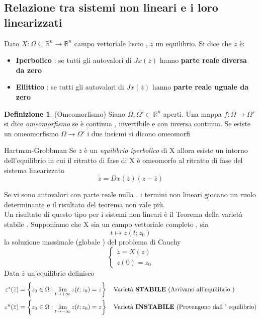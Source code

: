 \documentclass{article}
\theoremstyle{definition}
\newtheorem{definizione}{Definizione}[section]
\newcommand{\R}{\mathbb{R}}
\newcommand{\Rn}{\R^n}
\begin{document}
\subsection{Relazione tra sistemi non lineari e i loro linearizzati }
Dato $X: \Omega\subseteq\Rn\rightarrow\Rn$ campo vettoriale liscio , $\overline{z}$ un equilibrio. Si dice che $\overline{z}$ è: 
\begin{itemize}
	\item  \textbf{Iperbolico} : se tutti gli autovalori di $Jx(\overline{z})$ hanno\textbf{ parte reale diversa da zero }
	\item  \textbf{Ellittico} : se tutti gli autovalori di $Jx(\overline{z})$ hanno\textbf{ parte reale uguale da zero }
\end{itemize}
\begin{definizione}(Omeomorfismo)\newline
Siano $\Omega,\Omega' \subset \Rn$ aperti. Una mappa $f:\Omega \rightarrow \Omega'$ si dice \textit{omeomorfismo} se è continua , invertibile e con inversa continua. 
Se esiste un omeomorfismo $\Omega \rightarrow \Omega'$ i due insiemi si dicono omeomorfi  
\end{definizione}
\begin{teo}{Hartman-Grobbman}{}
	Se $\overline{z}$ è un \textit{equilibrio iperbolico} di X allora esiste un intorno dell'equilibrio in cui il ritratto di fase di X è omeomorfo al ritratto di fase del sistema  linearizzato 
	$$\dot{z}=Dx(\overline{z})(z-\overline{z})$$
\end{teo}
Se vi sono autovalori con parte reale nulla . i termini non lineari giocano un ruolo determinante e il risultato del teorema non vale più.\\
Un risultato di questo tipo per i sistemi non lineari è il Teorema della varietà stabile . Supponiamo che X sia un campo vettoriale completo , sia $$t \mapsto z(t;z_0)$$ la soluzione massimale (globale ) del problema di Cauchy $$\begin{cases}
	\dot{z}=X(z)\\
	z(0)=z_0
\end{cases}$$
Data $\overline{z}$ un'equilibrio definisco 
\begin{align*}
	\varepsilon^s(\overline{z})&=\left\{z_0 \in \Omega : \lim_{t\rightarrow+\infty}z(t;z_0)=z\right\} \ \ \ \text{Varietà \textbf{STABILE} (Arrivano all'equilibrio )}\\
		\varepsilon^u(\overline{z})&=\left\{z_0 \in \Omega : \lim_{t\rightarrow-\infty}z(t;z_0)=z\right\} \ \ \ \text{Varietà \textbf{INSTABILE} (Provengono dall ' equilibrio)}
\end{align*} 
\end{document}
